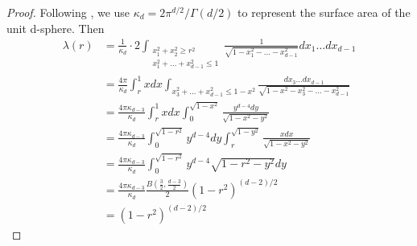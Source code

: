 \documentclass{aptpub}
\begin{document}
\begin{proof}
     Following \cite{dwyer1991convex}, we use $\kappa_d = 2\pi^{d/2}/\Gamma(d/2)$
     to represent the surface area of the unit d-sphere. Then
     \begin{align}
          \lambda(r) &=\frac{1}{\kappa_d} 
          \cdot 2\int_{\substack{x_1^2+x_2^2\geq r^2\\
          x_1^2+\dots+x_{d-1}^2\leq 1 }} 
          \frac{1}{\sqrt{1-x_1^2-\dots -x_{d-1}^2}} dx_1 \dots dx_{d-1}\\
      &= \frac{4\pi}{\kappa_d} \int_r^1 xdx \int_{x_3^2+\dots + x_{d-1}^2 \leq 1-x^2} \frac{dx_3\dots dx_{d-1}}
      {\sqrt{1-x^2-x_3^2-\dots -x_{d-1}^2}} \\
      &=\frac{4\pi \kappa_{d-3}}{\kappa_d} \int_r^1 xdx \int_0^{\sqrt{1-x^2}} \frac{y^{d-4}dy}{\sqrt{1-x^2-y^2}}\\
      &=\frac{4\pi \kappa_{d-3}}{\kappa_d} \int_0^{\sqrt{1-r^2}} y^{d-4}dy \int_r^{\sqrt{1-y^2}} \frac{xdx}{\sqrt{1-x^2-y^2}}\\
      &=\frac{4\pi \kappa_{d-3}}{\kappa_d} \int_0^{\sqrt{1-r^2}} y^{d-4}\sqrt{1-r^2-y^2} dy\\
      &=\frac{4\pi \kappa_{d-3}}{\kappa_d}  \frac{B(\frac{3}{2 }, \frac{d-3}{2})}{2}(1-r^2)^{(d-2)/2}\\
      &=  (1-r^2)^{(d-2)/2}
      \end{align}
\end{proof}
\end{document}
